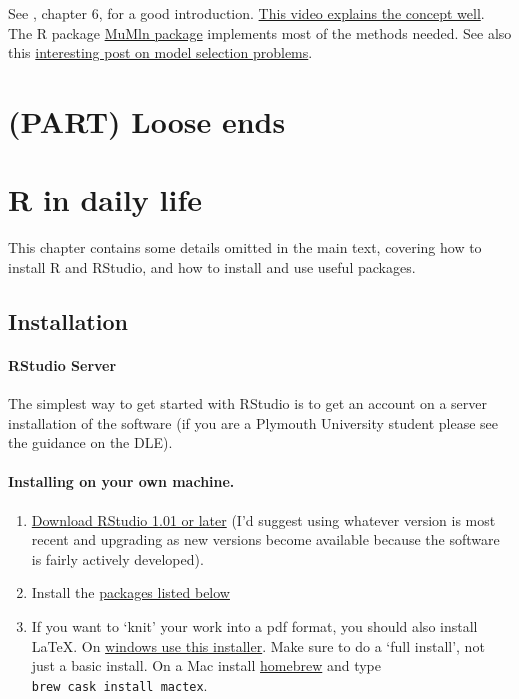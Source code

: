 \documentclass[]{article}
\let\oldparagraph\paragraph
\renewcommand{\paragraph}[1]{\oldparagraph{#1}\mbox{}}
\theoremstyle{definition}
\theoremstyle{definition}
\theoremstyle{definition}
\theoremstyle{remark}
\begin{document}
See \citet{mcelreath2016rethinking}, chapter 6, for a good introduction.
\href{https://www.youtube.com/watch?v=LQb7l5IfS0s}{This video explains
the concept well}. The R package
\href{https://cran.r-project.org/web/packages/MuMIn/index.html}{MuMln
package} implements most of the methods needed. See also this
\href{https://www.r-bloggers.com/model-selection-and-multi-model-inference/}{interesting
post on model selection problems}.

\section{(PART) Loose ends}\label{part-loose-ends}

\section{R in daily life}\label{r-details}

This chapter contains some details omitted in the main text, covering
how to install R and RStudio, and how to install and use useful
packages.

\subsection*{Installation}\label{installation-intro}

\paragraph{RStudio Server}\label{rstudio-server}

The simplest way to get started with RStudio is to get an account on a
server installation of the software (if you are a Plymouth University
student please see the guidance on the DLE).

\paragraph{Installing on your own machine.}\label{local-install}

\begin{enumerate}
\def\labelenumi{\arabic{enumi}.}
\item
  \href{https://www.rstudio.com/products/rstudio/download/}{Download
  RStudio 1.01 or later} (I'd suggest using whatever version is most
  recent and upgrading as new versions become available because the
  software is fairly actively developed).
\item
  Install the \protect\hyperlink{dependencies}{packages listed below}
\item
  If you want to `knit' your work into a pdf format, you should also
  install LaTeX. On \href{https://miktex.org/download}{windows use this
  installer}. Make sure to do a `full install', not just a basic
  install. On a Mac install \href{https://brew.sh}{homebrew} and type
  \texttt{brew\ cask\ install\ mactex}.
\end{enumerate}
\end{document}

